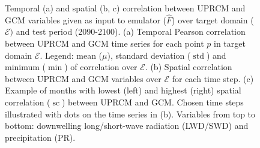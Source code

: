 \documentclass[a4paper,11pt,oneside]{report}
\begin{document}
\begin{figure}[tbp]
\begin{subfigure}[b]{\columnwidth}
        \end{subfigure}
        \hfill
        \caption[]
        {\small Temporal (a) and spatial (b, c) correlation between UPRCM and GCM variables given as input to emulator ($\hat{F}$) over target domain ($\mathcal{E})$ and test period (2090-2100). (a) Temporal Pearson correlation between UPRCM and GCM time series for each point $p$ in target domain $\mathcal{E}$. Legend: mean ($\mu$), standard deviation ($\operatorname{std}$) and minimum ($\operatorname{min}$) of correlation over $\mathcal{E}$. (b) Spatial correlation between UPRCM and GCM variables over $\mathcal{E}$ for each time step. (c) Example of months with lowest (left) and highest (right) spatial correlation ($\operatorname{sc}$) between UPRCM and GCM. Chosen time steps illustrated with dots on the time series in (b). Variables from top to bottom: downwelling long/short-wave radiation (LWD/SWD) and precipitation (PR).} 
        \label{fig:corr-GCM-RCM}
    \end{figure}

\end{document}
